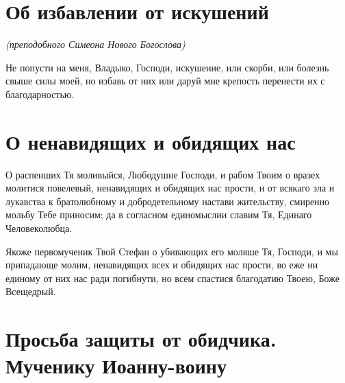 

\label{_content_molitvi-vskorbyah}

 


 

\section{Об избавлении от искушений}
 


\itshape (преподобного Симеона Нового Богослова)

\normalfont{}Не попусти на меня, Владыко, Господи, искушение, или скорби, или болезнь свыше силы моей, но избавь от них или даруй мне крепость перенести их с благодарностью.





\section{О ненавидящих и обидящих нас}
 




О распенших Тя моливыйся, Любодушне Господи, и рабом Твоим о вразех молитися повелевый, ненавидящих и обидящих нас прости, и от всякаго зла и лукавства к братолюбному и добродетельному настави жительству, смиренно мольбу Тебе приносим; да в согласном единомыслии славим Тя, Единаго Человеколюбца.




Якоже первомученик Твой Стефан о убивающих его моляше Тя, Господи, и мы припадающе молим, ненавидящих всех и обидящих нас прости, во еже ни единому от них нас ради погибнути, но всем спастися благодатию Твоею, Боже Всещедрый.


\section{Просьба защиты от обидчика. Мученику Иоанну-воину}
 




